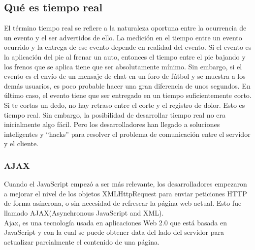 \subsection{Qué es tiempo real}
El término tiempo real se refiere a la naturaleza oportuna entre la ocurrencia de un evento y el ser advertidos de ello. La medición en el tiempo entre un evento ocurrido y la entrega de ese evento depende en realidad del evento. Si el evento es la aplicación del pie al frenar un auto, entonces el tiempo entre el pie bajando y los frenos que se aplica tiene que ser absolutamente mínimo. Sin embargo, si el evento es el envío de un mensaje de chat en un foro de fútbol y se muestra a los demás usuarios, es poco probable hacer una gran diferencia de unos segundos. En último caso, el evento tiene que ser entregado en un tiempo suficientemente corto. Si te cortas un dedo, no hay retraso entre el corte y el registro de dolor. Esto es tiempo real. Sin embargo, la posibilidad de desarrollar tiempo real no era inicialmente algo fácil. Pero los desarrolladores han llegado a soluciones inteligentes y ``hacks'' para resolver el problema de comunicación entre el servidor y el cliente.

\subsubsection{AJAX}
Cuando el JavaScript empezó a ser más relevante, los desarrolladores empezaron a mejorar el nivel de los objetos XMLHttpRequest para enviar peticiones HTTP de forma asíncrona, o sin necesidad de refrescar la página web actual. Esto fue llamado AJAX(Asynchronous JavaScript and XML).\\

Ajax, es una tecnología usada en aplicaciones Web 2.0 que está basada en JavaScript y con la cual se puede obtener data del lado del servidor para actualizar parcialmente el contenido de una página\cite{wang_design_2014}.

